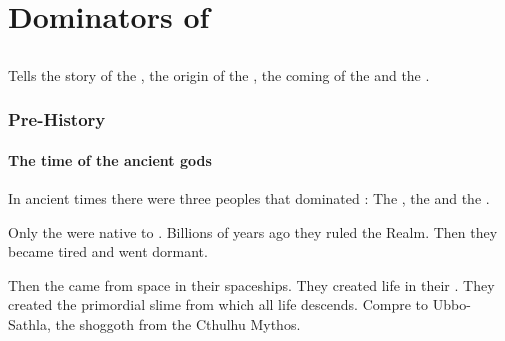 
\begin{comment}
\part{The Book Series of \Miith}
\end{comment}
\begin{comment}







\end{comment}



\part{Dominators of \Miith}















\chapter{\FirstbanewarBook}
Tells the story of the \ophidians, the origin of the \draecchonosh{}, the coming of the \banes{} and the \firstbanewar. 















\section{Pre-History}
\subsection{The time of the ancient gods}
In ancient times there were three peoples that dominated \Miith{}: The \krakens, the \xss{} and the \voyagers. 

Only the \krakens{} were native to \Miith{}. 
Billions of years ago they ruled the Realm. 
Then they became tired and went dormant. 

Then the \voyagers{} came from space in their spaceships. 
They created life in their . 
They created the primordial slime from which all \Miithian{} life descends. Compre to Ubbo-Sathla, the shoggoth  from the Cthulhu Mythos. 

